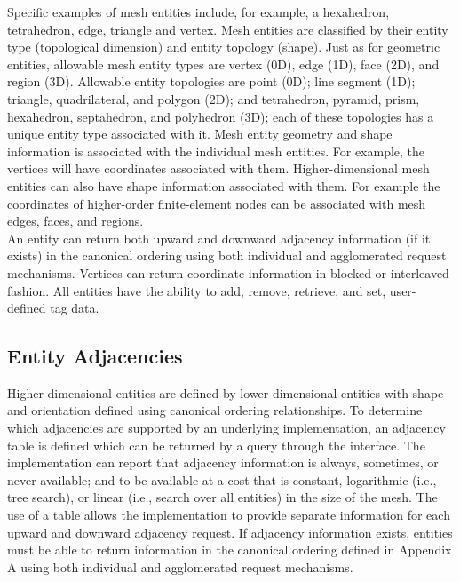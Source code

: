 \documentclass{article}
\begin{document}
Specific examples of mesh entities include, for example, a hexahedron, 
tetrahedron, edge, triangle and vertex. Mesh entities are classified 
by their entity type (topological dimension) and entity topology 
(shape). Just as for geometric entities, allowable mesh entity 
types are vertex (0D), edge (1D), face (2D), and region (3D). 
Allowable entity topologies are point (0D); line segment (1D); 
triangle, quadrilateral, and polygon (2D); and tetrahedron, pyramid, 
prism, hexahedron, septahedron, and polyhedron (3D); each of 
these topologies has a unique entity type associated with it. 
Mesh entity geometry and shape information is associated with 
the individual mesh entities. For example, the vertices will 
have coordinates associated with them. Higher-dimensional mesh 
entities can also have shape information associated with them. 
For example the coordinates of higher-order finite-element nodes 
can be associated with mesh edges, faces, and regions.\\

An entity can return both upward and downward 
adjacency information (if it exists) in the canonical ordering 
using both individual and agglomerated request mechanisms. Vertices 
can return coordinate information in blocked or interleaved fashion. 
All entities have the ability to add, remove, retrieve, and set, 
user-defined tag data. 

\subsection{Entity Adjacencies}

Higher-dimensional entities are defined by lower-dimensional 
entities with shape and orientation defined using canonical ordering 
relationships. To determine which adjacencies are supported by 
an underlying implementation, an adjacency table is defined which 
can be returned by a query through the interface. The implementation 
can report that adjacency information is always, sometimes, or 
never available; and to be available at a cost that is constant, 
logarithmic (i.e., tree search), or linear (i.e., search over all entities) 
in the size of the mesh. The use of a table allows the implementation 
to provide separate information for each upward and downward 
adjacency request. If adjacency information exists, entities 
must be able to return information in the canonical ordering defined 
in Appendix A using both individual and agglomerated request 
mechanisms.\\
\end{document}
